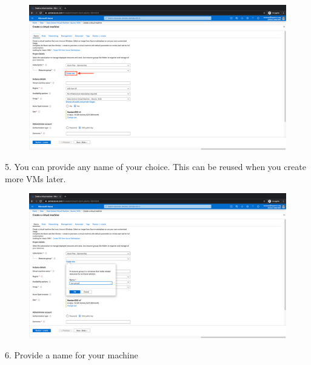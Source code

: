 \begin{figure}[H]
\begin{center} 
\includegraphics[scale=0.20]{figures/vm4}
\end{center}
\end{figure}

5. You can provide any name of your choice. This can be reused when you create more VMs later.

\begin{figure}[H]
\begin{center} 
\includegraphics[scale=0.20]{figures/vm5}
\end{center}
\end{figure}

6. Provide a name for your machine

